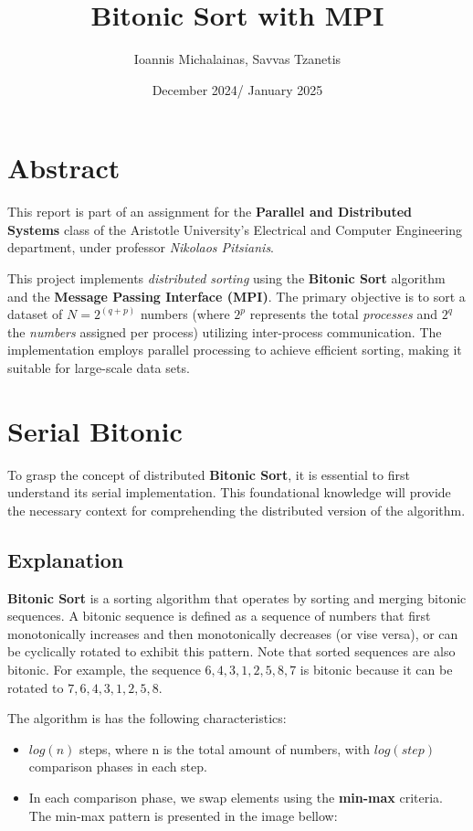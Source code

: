 \documentclass[12pt]{report}
\begin{document}
\title{\textbf{Bitonic Sort with MPI}}
\author{Ioannis Michalainas, Savvas Tzanetis}
\date{December 2024/ January 2025}
\maketitle

\tableofcontents

\chapter{Abstract}
This report is part of an assignment for the \textbf{Parallel and Distributed Systems} class of the
Aristotle University's Electrical and Computer Engineering department, under professor \textit{Nikolaos Pitsianis}. 

This project implements \textit{distributed sorting} using the \textbf{Bitonic Sort} algorithm and the \textbf{Message Passing Interface (MPI)}. The primary objective is to sort a dataset of $N = 2^{(q+p)}$ numbers (where $2^p$ represents the total \textit{processes} and $2^q$ the \textit{numbers} assigned per process) utilizing inter-process communication. The implementation employs parallel processing to achieve efficient sorting, making it suitable for large-scale data sets.

\chapter{Serial Bitonic}

To grasp the concept of distributed \textbf{Bitonic Sort}, it is essential to first understand its serial implementation. This foundational knowledge will provide the necessary context for comprehending the distributed version of the algorithm.

\section{Explanation}

\textbf{Bitonic Sort} is a sorting algorithm that operates by sorting and merging bitonic sequences. A bitonic sequence is defined as a sequence of numbers that first monotonically increases and then monotonically decreases (or vise versa), or can be cyclically rotated to exhibit this pattern. Note that sorted sequences are also bitonic. For example, the sequence $6, 4, 3, 1, 2, 5, 8, 7$ is bitonic because it can be rotated to $7, 6, 4, 3, 1, 2, 5, 8$. 

The algorithm is has the following characteristics:
\begin{itemize}
    \item $log(n)$ steps, where n is the total amount of numbers, with $log(step)$ comparison phases in each step.
    \item In each comparison phase, we swap elements using the \textbf{min-max} criteria. The min-max pattern is presented in the image bellow:
\end{itemize}
\end{document}
